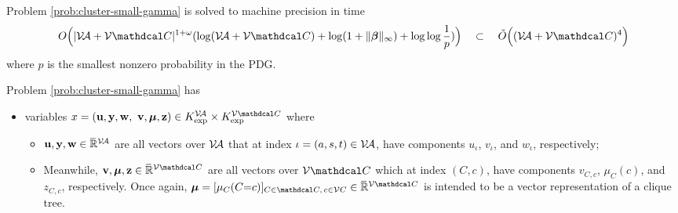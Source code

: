 \documentclass[twoside]{article}
\begin{document}
\begin{lemma}\label{lem:smallgamma-polytime}
    Problem \eqref{prob:cluster-small-gamma} is solved to machine precision in time
    \[
        O\Big( |\V\!\Ar + \V\mathdcal C|^{1 + \omega} ( \log (\V\!\Ar + \V\mathdcal C) + \log(1+ \Vert\bbeta\Vert_\infty) + \log \log \frac{1}{p}) \Big)
        \quad
        \subset 
        \quad
        \tilde O\Big( (\V\!\Ar + \V\mathdcal C)^4 \Big)
    \]
    where $p$ is the smallest nonzero probability in the PDG.
\end{lemma}
\begin{lproof}
    Problem \eqref{prob:cluster-small-gamma} has 
    \begin{itemize}[label=$\blacktriangleright$]
    \item variables 
        $x = (\mat u, \mat y, \mat w,\,\, \mat v, \bmu, \mat z)
        \in K_{\exp}^{\V\!\Ar} \times K_{\exp}^{\V \mathdcal C}$
        where 
        \begin{itemize}[label=\textbullet]
        \item 
        $\mathbf{u,y,w} \in \mskip1mu\overline{\mskip-1mu\mathbb R\!}\,^{\mathcal V\!\mathcal A}$
            are all vectors over $\mathcal V\!\mathcal A$
            that at index $\iota = (a,s,t) \in \mathcal V\!\mathcal A$, have 
            components $u_\iota$, $v_\iota$, and $w_\iota$, respectively;
        \item 
        Meanwhile, 
        $\mathbf{v,\bmu,z} \in \Rext^{\V\mathdcal C}$
            are all vectors over $\V\mathdcal C$ 
            which at index $(C,c)$, have 
            components $v_{C,c}$, $\mu_C(c)$, and $z_{C,c}$, respectively.
            Once again, $\bmu = [\mu_{C}(C{=}c)]_%
            {C \in \mathdcal C,\,c \in\V C}
             \in \Rext^{\V \mathdcal C}$ is intended to be a vector representation of a clique tree.
    \end{itemize}


\end{itemize}
\end{lproof}
\end{document}
